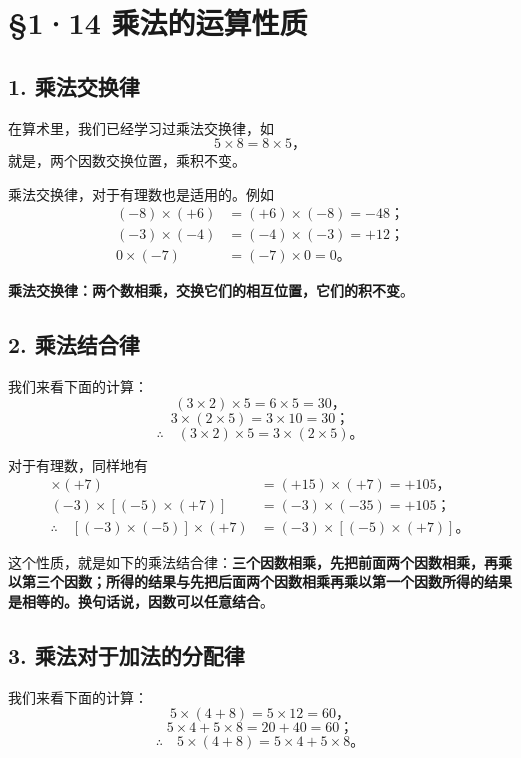 \section{§1·14 乘法的运算性质}

\subsection{1. 乘法交换律}

在算术里，我们已经学习过乘法交换律，如
\[
5 \times 8 = 8 \times 5，
\]
就是，两个因数交换位置，乘积不变。

乘法交换律，对于有理数也是适用的。例如
\begin{align*}
(-8) \times (+6) &= (+6) \times (-8) = -48； \\
(-3) \times (-4) &= (-4) \times (-3) = +12； \\
0 \times (-7) &= (-7) \times 0 = 0。
\end{align*}

\textbf{乘法交换律：两个数相乘，交换它们的相互位置，它们的积不变}。

\subsection{2. 乘法结合律}

我们来看下面的计算：
\[
(3 \times 2) \times 5 = 6 \times 5 = 30，
\]
\[
3 \times (2 \times 5) = 3 \times 10 = 30；
\]
\[
\therefore\quad (3 \times 2) \times 5 = 3 \times (2 \times 5)。
\]

对于有理数，同样地有
\begin{align*}
[(-3) \times (-5)] \times (+7) &= (+15) \times (+7) = +105， \\
(-3) \times [(-5) \times (+7)] &= (-3) \times (-35) = +105； \\
\therefore\quad [(-3) \times (-5)] \times (+7) &= (-3) \times [(-5) \times (+7)]。
\end{align*}

这个性质，就是如下的乘法结合律：\textbf{三个因数相乘，先把前面两个因数相乘，再乘以第三个因数；所得的结果与先把后面两个因数相乘再乘以第一个因数所得的结果是相等的。换句话说，因数可以任意结合}。

\subsection{3. 乘法对于加法的分配律}

我们来看下面的计算：
\[
5 \times (4 + 8) = 5 \times 12 = 60，
\]
\[
5 \times 4 + 5 \times 8 = 20 + 40 = 60；
\]
\[
\therefore\quad 5 \times (4 + 8) = 5 \times 4 + 5 \times 8。
\]

